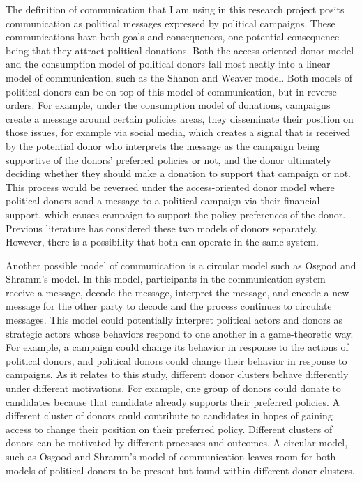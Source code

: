 \documentclass[12pt,]{article}
\begin{document}
The definition of communication that I am using in this research project
posits communication as political messages expressed by political
campaigns. These communications have both goals and consequences, one
potential consequence being that they attract political donations. Both
the access-oriented donor model and the consumption model of political
donors fall most neatly into a linear model of communication, such as
the Shanon and Weaver model. Both models of political donors can be on
top of this model of communication, but in reverse orders. For example,
under the consumption model of donations, campaigns create a message
around certain policies areas, they disseminate their position on those
issues, for example via social media, which creates a signal that is
received by the potential donor who interprets the message as the
campaign being supportive of the donors' preferred policies or not, and
the donor ultimately deciding whether they should make a donation to
support that campaign or not. This process would be reversed under the
access-oriented donor model where political donors send a message to a
political campaign via their financial support, which causes campaign to
support the policy preferences of the donor. Previous literature has
considered these two models of donors separately. However, there is a
possibility that both can operate in the same system.

Another possible model of communication is a circular model such as
Osgood and Shramm's model. In this model, participants in the
communication system receive a message, decode the message, interpret
the message, and encode a new message for the other party to decode and
the process continues to circulate messages. This model could
potentially interpret political actors and donors as strategic actors
whose behaviors respond to one another in a game-theoretic way. For
example, a campaign could change its behavior in response to the actions
of political donors, and political donors could change their behavior in
response to campaigns. As it relates to this study, different donor
clusters behave differently under different motivations. For example,
one group of donors could donate to candidates because that candidate
already supports their preferred policies. A different cluster of donors
could contribute to candidates in hopes of gaining access to change
their position on their preferred policy. Different clusters of donors
can be motivated by different processes and outcomes. A circular model,
such as Osgood and Shramm's model of communication leaves room for both
models of political donors to be present but found within different
donor clusters.
\end{document}
